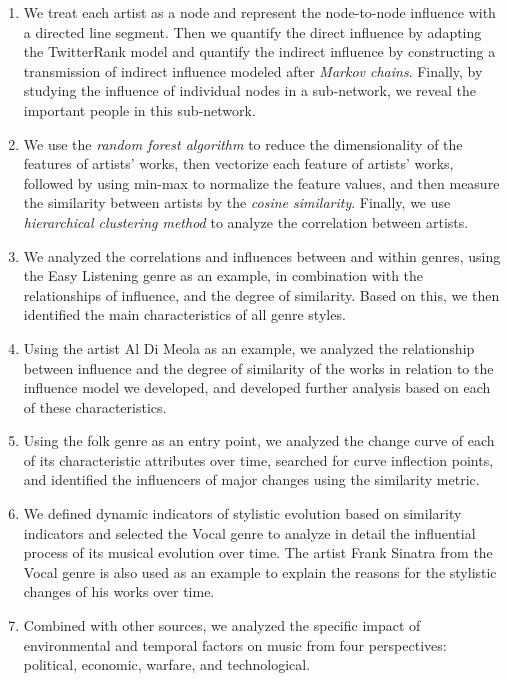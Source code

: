 \documentclass[12pt]{article}  %
\begin{document}
\begin{enumerate}[\bfseries 1.]
	\setlength{\parsep}{0ex} %
	\setlength{\topsep}{2ex} %
	\setlength{\itemsep}{1ex} %
	\item We treat each artist as a node and represent the node-to-node influence with a directed line segment. Then we quantify the direct influence by adapting the TwitterRank model and quantify the indirect influence by constructing a transmission of indirect influence modeled after \textit{Markov chains}. Finally, by studying the influence of individual nodes in a sub-network, we reveal the important people in this sub-network. 
	\item We use the \textit{random forest algorithm} to reduce the dimensionality of the features of artists' works, then vectorize each feature of artists' works, followed by using min-max to normalize the feature values, and then measure the similarity between artists by the \textit{cosine similarity}. Finally, we use \textit{hierarchical clustering method} to analyze the correlation between artists.
	\item We analyzed the correlations and influences between and within genres, using the Easy Listening genre as an example, in combination with the relationships of influence, and the degree of similarity. Based on this, we then identified the main characteristics of all genre styles.
	\item Using the artist Al Di Meola as an example, we analyzed the relationship between influence and the degree of similarity of the works in relation to the influence model we developed, and developed further analysis based on each of these characteristics.
	\item Using the folk genre as an entry point, we analyzed the change curve of each of its characteristic attributes over time, searched for curve inflection points, and identified the influencers of major changes using the similarity metric.
	\item We defined dynamic indicators of stylistic evolution based on similarity indicators and selected the Vocal genre to analyze in detail the influential process of its musical evolution over time. The artist Frank Sinatra from the Vocal genre is also used as an example to explain the reasons for the stylistic changes of his works over time.
	\item Combined with other sources, we analyzed the specific impact of environmental and temporal factors on music from four perspectives: political, economic, warfare, and technological.
\end{enumerate}
\end{document}
